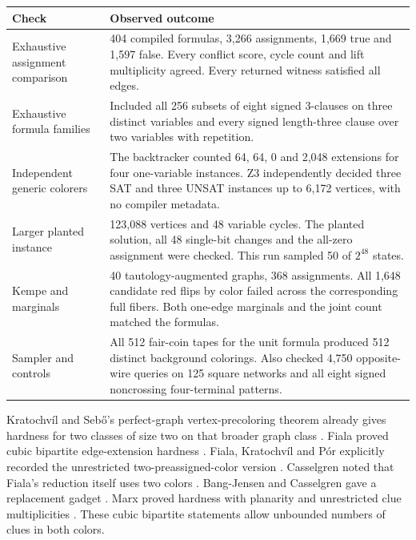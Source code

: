 \documentclass[12pt,letterpaper]{article}
\newcommand{\sh}[1]{\par\smallskip{\bfseries\color{ink}#1}\quad}
\begin{document}
\begin{center}\small
\begin{tabular}{@{}p{.33\linewidth}p{.60\linewidth}@{}}\toprule
Check & Observed outcome\\\midrule
Exhaustive assignment comparison & 404 compiled formulas, 3,266 assignments, 1,669 true and 1,597 false. Every conflict score, cycle count and lift multiplicity agreed. Every returned witness satisfied all edges.\\[3pt]
Exhaustive formula families & Included all 256 subsets of eight signed 3-clauses on three distinct variables and every signed length-three clause over two variables with repetition.\\[3pt]
Independent generic colorers & The backtracker counted 64, 64, 0 and 2,048 extensions for four one-variable instances. Z3 independently decided three SAT and three UNSAT instances up to 6,172 vertices, with no compiler metadata.\\[3pt]
Larger planted instance & 123,088 vertices and 48 variable cycles. The planted solution, all 48 single-bit changes and the all-zero assignment were checked. This run sampled 50 of \(2^{48}\) states.\\[3pt]
Kempe and marginals & 40 tautology-augmented graphs, 368 assignments. All 1,648 candidate red flips by color failed across the corresponding full fibers. Both one-edge marginals and the joint count matched the formulas.\\[3pt]
Sampler and controls & All 512 fair-coin tapes for the unit formula produced 512 distinct background colorings. Also checked 4,750 opposite-wire queries on 125 square networks and all eight signed noncrossing four-terminal patterns.\\\bottomrule
\end{tabular}
\end{center}

\sh{Prior art and scope.}
Kratochv\'il and Seb\H{o}'s perfect-graph vertex-precoloring theorem already gives hardness for two classes of size two on that broader graph class \cite{ks}. Fiala proved cubic bipartite edge-extension hardness \cite{fiala}. Fiala, Kratochv\'il and P\'or explicitly recorded the unrestricted two-preassigned-color version \cite{fkp}. Casselgren noted that Fiala's reduction itself uses two colors \cite{cass}. Bang-Jensen and Casselgren gave a replacement gadget \cite{bc}. Marx proved hardness with planarity and unrestricted clue multiplicities \cite{marx}. These cubic bipartite statements allow unbounded numbers of clues in both colors.
\end{document}
